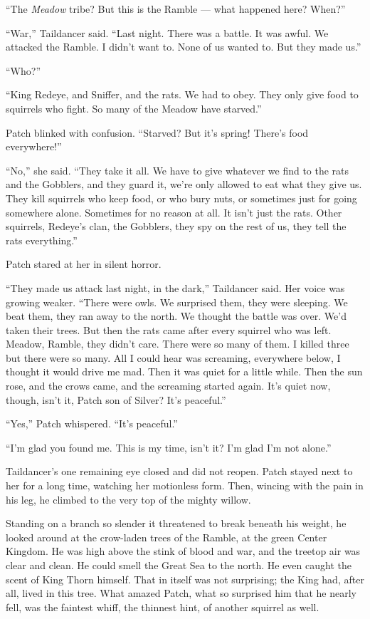 \documentclass[ebook,oneside,openany,17pt]{memoir}
\begin{document}
“The \emph{Meadow} tribe? But this is the Ramble — what happened
here? When?”

“War,” Taildancer said. “Last night. There was a battle. It was
awful. We attacked the Ramble. I didn’t want to. None of us wanted
to. But they made us.”

“Who?”

“King Redeye, and Sniffer, and the rats. We had to obey. They only
give food to squirrels who fight. So many of the Meadow have starved.”

Patch blinked with confusion. “Starved? But it’s spring! There’s food
everywhere!”

“No,” she said. “They take it all. We have to give whatever we find to
the rats and the Gobblers, and they guard it, we’re only allowed to
eat what they give us. They kill squirrels who keep food, or who bury
nuts, or sometimes just for going somewhere alone. Sometimes for no
reason at all. It isn’t just the rats. Other squirrels, Redeye’s clan,
the Gobblers, they spy on the rest of us, they tell the rats
everything.”

Patch stared at her in silent horror.

“They made us attack last night, in the dark,” Taildancer said. Her
voice was growing weaker. “There were owls. We surprised them, they
were sleeping. We beat them, they ran away to the north. We thought
the battle was over. We’d taken their trees. But then the rats came
after every squirrel who was left. Meadow, Ramble, they didn’t
care. There were so many of them. I killed three but there were so
many. All I could hear was screaming, everywhere below, I thought it
would drive me mad. Then it was quiet for a little while. Then the sun
rose, and the crows came, and the screaming started again. It’s quiet
now, though, isn’t it, Patch son of Silver? It’s peaceful.”

“Yes,” Patch whispered. “It’s peaceful.”

“I’m glad you found me. This is my time, isn’t it? I’m glad I’m not
alone.”

Taildancer’s one remaining eye closed and did not reopen. Patch stayed
next to her for a long time, watching her motionless form. Then,
wincing with the pain in his leg, he climbed to the very top of the
mighty willow.

Standing on a branch so slender it threatened to break beneath his
weight, he looked around at the crow-laden trees of the Ramble, at the
green Center Kingdom. He was high above the stink of blood and war,
and the treetop air was clear and clean. He could smell the Great Sea
to the north. He even caught the scent of King Thorn himself. That in
itself was not surprising; the King had, after all, lived in this
tree. What amazed Patch, what so surprised him that he nearly fell,
was the faintest whiff, the thinnest hint, of another squirrel as
well.
\end{document}
